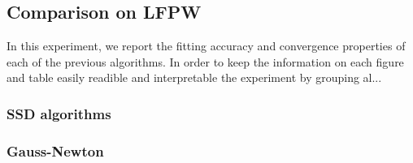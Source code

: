\subsection{Comparison on LFPW}

In this experiment, we report the fitting accuracy and convergence properties of each of the previous algorithms. In order to keep the information on each figure and table easily readible and interpretable the experiment by grouping al...


\subsubsection{SSD algorithms}


\subsubsection*{Gauss-Newton}

